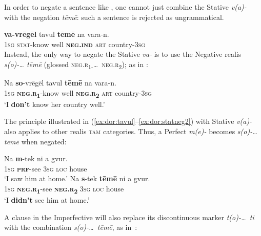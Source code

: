 \documentclass[output=paper,colorlinks,citecolor=brown,draft]{langscibook}
\begin{document}
In order to negate a sentence like , one cannot just combine the Stative \textit{v(a)-} with the negation \textit{tēmē}: such a sentence  is rejected as ungrammatical.
     
    \ea\label{ex:dor:statneg}
         \textbf{{va-}vrēgēl} {tavul} \textbf{{tēmē}} {na} vara-n.\\ 
              \textsc{1sg} \textsc{stat-}know well \textbf{\textsc{neg.ind}} \textsc{art} country-\textsc{3sg}\\
    \z
Instead, the only way to negate the Stative \textit{va-} is to use the Negative realis \textit{s(o)-… tēmē} (glossed \textsc{neg.r}\textsubscript{1-}\ldots\ \textsc{neg.r}\textsubscript{2}); as in :

    \ea\label{ex:dor:statneg2}
        \gll  Na \textbf{so}-vrēgēl tavul \textbf{tēmē} na vara-n.\\
              \textsc{1sg} \textbf{\textsc{neg.r}}\textbf{\textsubscript{1}}\textsc{-}know well \textbf{\textsc{neg.r}}\textbf{\textsubscript{2}} \textsc{art} country-\textsc{3sg}\\
        \glt ‘I \textbf{don’t} know her country well.’ 
    \z


\noindent The principle illustrated in (\ref{ex:dor:tavul}--\ref{ex:dor:statneg2}) with Stative \textit{v(a)-} also applies to other \mbox{realis} \textsc{tam} categories. Thus, a Perfect  \textit{m(e)-} becomes  \textit{s(o)-… tēmē} when negated:

\ea\label{ex:dor:home}
    \ea\label{ex:dor:home1}
        \gll  Na \textbf{m}-tek ni a gvur.\\ 
              \textsc{1sg} \textbf{\textsc{prf}}\textsc{-}see \textsc{3sg} \textsc{loc} house\\
        \glt ‘I saw him at home.’
    \ex\label{ex:dor:home2}
        \gll  Na \textbf{s}-tek \textbf{tēmē} ni a gvur.\\
              \textsc{1sg} \textbf{\textsc{neg.r}}\textbf{\textsubscript{1}}-see \textbf{\textsc{neg.r}}\textbf{\textsubscript{2}} \textsc{3sg} \textsc{loc} house\\
        \glt ‘I \textbf{didn’t} see him at home.’
    \z
\z 

A clause in the Imperfective will also replace its discontinuous marker \textit{t(o)-\ldots~ti} with the combination \textit{s(o)-\ldots\ tēmē}, as in~:
\end{document}
